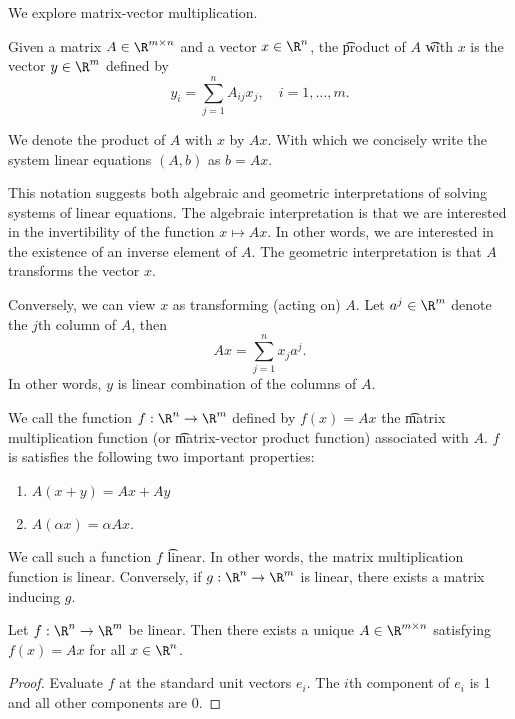 
We explore matrix-vector multiplication.

Given a matrix $A \in \R^{m \times n}$ and a vector $x \in \R^{n}$, the \t{product} of $A$ \t{with} $x$ is the vector $y \in \R^{m}$ defined by
  \[
y_i = \sum_{j = 1}^{n} A_{ij} x_j, \quad i = 1, \dots, m.
  \]

We denote the product of $A$ with $x$ by $Ax$.
With which we concisely write the system linear equations $(A, b)$ as $b = Ax$.

This notation suggests both algebraic and geometric interpretations of solving systems of linear equations.
The algebraic interpretation is that we are interested in the invertibility of the function $x \mapsto Ax$.
In other words, we are interested in the existence of an inverse element of $A$.
The geometric interpretation is that $A$ transforms the vector $x$.

Conversely, we can view $x$ as transforming (acting on) $A$.
Let $a^j \in \R^m$ denote the $j$th column of $A$, then
  \[
Ax = \sum_{j = 1}^{n} x_j a^j.
  \]
In other words, $y$ is linear combination of the columns of $A$.

We call the function $f: \R^n \to \R^m$ defined by $f(x) = Ax$ the \t{matrix multiplication function} (or \t{matrix-vector product function}) associated with $A$.
$f$ is satisfies the following two important properties:
  \begin{enumerate}
  \item $A(x + y) = Ax + Ay$
  \item $A(\alpha x) = \alpha Ax$.
  \end{enumerate}
We call such a function $f$ \t{linear}.
In other words, the matrix multiplication function is linear.
Conversely, if $g: \R^n \to \R^m$ is linear, there exists a matrix inducing $g$.

\begin{proposition}
Let $f: \R^n \to \R^m$ be linear.
Then there exists a unique $A \in \R^{m \times n}$ satisfying $f(x) = Ax$ for all $x \in \R^n$.
\end{proposition}

\begin{proof}
Evaluate $f$ at the standard unit vectors $e_i$.
The $i$th component of $e_i$ is 1 and all other components are 0.
\end{proof}
